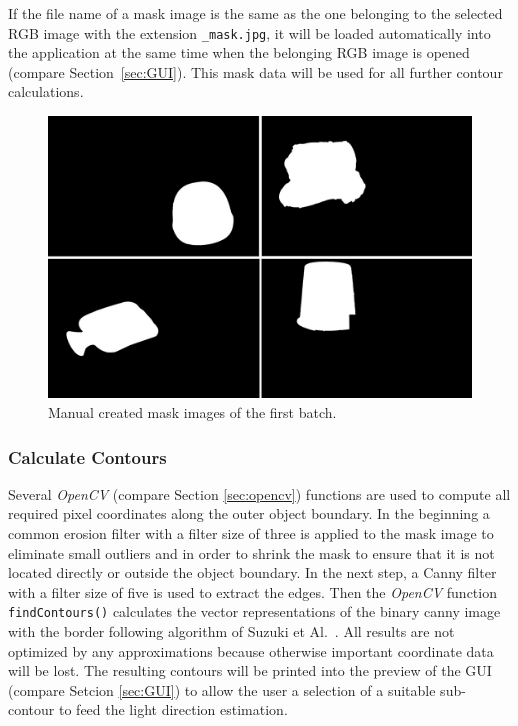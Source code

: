 If the file name of a mask image is the same as the one belonging to the selected RGB image with the extension \texttt{\_mask.jpg}, it will be loaded automatically into the application at the same time when the belonging RGB image is opened (compare Section~\ref{sec:GUI}). This mask data will be used for all further contour calculations.

\begin{figure} [H]
	\center 
	\includegraphics[width=12cm]{Images/batch1_mask.jpg}			
	\caption[Bildunterschrift]{Manual created mask images of the first batch.}
	\label{fig:batch1mask}
\end{figure}

\subsubsection{Calculate Contours}\label{sec:findContours}
Several \textit{OpenCV} (compare Section \ref{sec:opencv}) functions are used to compute all required pixel coordinates along the outer object boundary. In the beginning a common erosion filter with a filter size of three is applied to the mask image to eliminate small outliers and in order to shrink the mask to ensure that it is not located directly or outside the object boundary. In the next step, a Canny filter with a filter size of five is used to extract the edges. Then the \textit{OpenCV} function \texttt{findContours()} calculates the vector representations of the binary canny image with the border following algorithm of Suzuki et Al.~\cite{SUZUKI198532}. All results are not optimized by any approximations because otherwise important coordinate data will be lost. The resulting contours will be printed into the preview of the GUI (compare Setcion \ref{sec:GUI}) to allow the user a selection of a suitable sub-contour to feed the light direction estimation.

